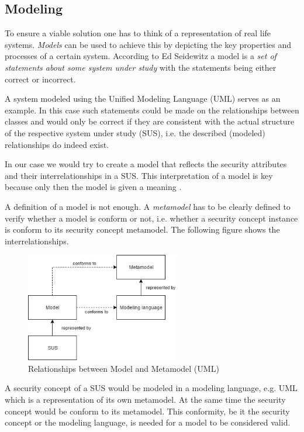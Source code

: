 \subsection{Modeling}
\label{subsec:interpretation}
To ensure a viable solution one has to think of a representation of real life systems. \textit{Models} can be used to achieve this by depicting the key properties and processes of a certain system. According to Ed Seidewitz \cite{seidewitz} a model is a \textit{\glqq set of statements about some system under study\grqq} with the statements being either correct or incorrect.

A system modeled using the Unified Modeling Language (UML) serves as an example. In this case such statements could be made on the relationships between classes and would only be correct if they are consistent with the actual structure of the respective system under study (SUS), i.e. the described (modeled) relationships do indeed exist. 

In our case we would try to create a model that reflects the security attributes and their interrelationships in a SUS. This interpretation of a model is key because only then the model is given a meaning \cite{seidewitz}.

A definition of a model is not enough. A \textit{metamodel} has to be clearly defined to verify whether a model is conform or not, i.e. whether a security concept instance is conform to its security concept metamodel. The following figure shows the interrelationships.

\begin{figure}[H]
\centering
\includegraphics[width=0.6\textwidth]{pictures/metamodel.png}
\caption{Relationships between Model and Metamodel (UML)}
\label{fig:metamodel}
\end{figure}

A security concept of a SUS would be modeled in a modeling language, e.g. UML which is a representation of its own metamodel. At the same time the security concept would be conform to its metamodel. This conformity, be it the security concept or the modeling language, is needed for a model to be considered valid. 

